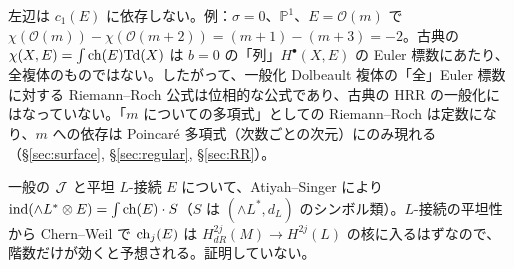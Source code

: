 \begin{rem}[意味\ \tP]\label{rem:Emeaning}
左辺は $c_1(E)$ に依存しない。例：$\sigma=0$、$\mathbb P^1$、$E=\mathcal O(m)$ で $\chi(\mathcal O(m))-\chi(\mathcal O(m+2))=(m+1)-(m+3)=-2$。古典の $\chi(X,E)=\int\mathrm{ch}(E)\mathrm{Td}(X)$ は $b=0$ の「列」$H^\bullet(X,E)$ の Euler 標数にあたり、全複体のものではない。したがって、一般化 Dolbeault 複体の「全」Euler 標数に対する Riemann--Roch 公式は位相的な公式であり、古典の HRR の一般化にはなっていない。「$m$ についての多項式」としての Riemann--Roch は定数になり、$m$ への依存は Poincar\'e 多項式（次数ごとの次元）にのみ現れる（\S\ref{sec:surface}, \S\ref{sec:regular}, \S\ref{sec:RR}）。
\end{rem}
\begin{rem}[一般の一般化複素構造\ \tK]
一般の $\mathcal J$ と平坦 $L$-接続 $E$ について、Atiyah--Singer により $\mathrm{ind}(\wedge L^*\otimes E)=\int\mathrm{ch}(E)\cdot S$（$S$ は $(\wedge L^*,d_L)$ のシンボル類）。$L$-接続の平坦性から Chern--Weil で $\mathrm{ch}_j(E)$ は $H^{2j}_{dR}(M)\to H^{2j}(L)$ の核に入るはずなので、階数だけが効くと予想される。証明していない。
\end{rem}

